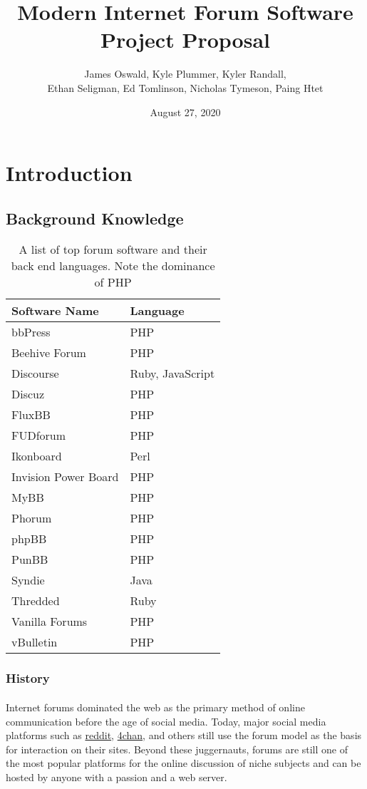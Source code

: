 \documentclass[]{article}
\title{Modern Internet Forum Software \\ Project Proposal}
\author{James Oswald, Kyle Plummer, Kyler Randall, \\ Ethan Seligman, Ed Tomlinson, Nicholas Tymeson, Paing Htet}
\date{August 27, 2020}
\begin{document}
\maketitle
\thispagestyle{fancy}

\section{Introduction}
\subsection{Background Knowledge}

\begin{wraptable}{r}{5.5cm}
\begin{tabular}{|l|l|}

\hline
\textbf{Software Name} & \textbf{Language} \\
\hline
bbPress & PHP \\
Beehive Forum & PHP \\
Discourse & Ruby, JavaScript \\
Discuz & PHP \\
FluxBB & PHP \\
FUDforum & PHP \\
Ikonboard & Perl \\
Invision Power Board & PHP \\
MyBB & PHP \\
Phorum & PHP \\
phpBB & PHP \\
PunBB & PHP \\
Syndie & Java \\
Thredded & Ruby \\
Vanilla Forums & PHP \\
vBulletin & PHP \\
\hline
\end{tabular}
\captionsetup{belowskip=0pt}
\caption{A list of top forum software and their back end languages. Note the dominance of PHP}
\end{wraptable}
\subsubsection{History}
\paragraph{}
Internet forums dominated the web as the primary method of online communication before the age of social media. Today, major social media platforms such as \href{https://www.reddit.com/}{reddit}, \href{https://www.4channel.org/}{4chan}, and others still use the forum model as the basis for interaction on their sites. Beyond these juggernauts, forums are still one of the most popular platforms for the online discussion of niche subjects and can be hosted by anyone with a passion and a web server. 
\end{document}
